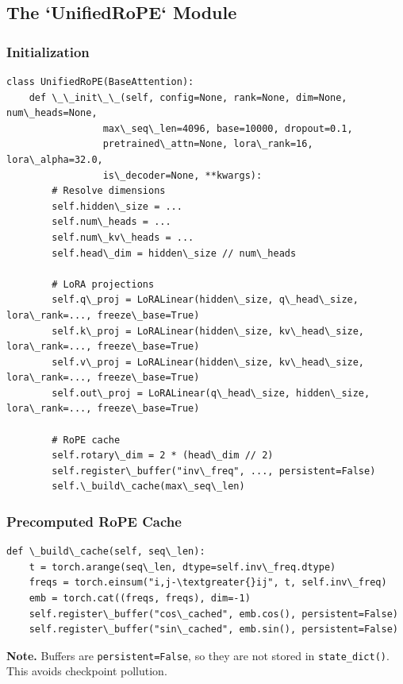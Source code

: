 \subsection{The `UnifiedRoPE` Module}

\subsubsection{Initialization}

\begin{lstlisting}
class UnifiedRoPE(BaseAttention):
    def \_\_init\_\_(self, config=None, rank=None, dim=None, num\_heads=None,
                 max\_seq\_len=4096, base=10000, dropout=0.1,
                 pretrained\_attn=None, lora\_rank=16, lora\_alpha=32.0,
                 is\_decoder=None, **kwargs):
        # Resolve dimensions
        self.hidden\_size = ...
        self.num\_heads = ...
        self.num\_kv\_heads = ...
        self.head\_dim = hidden\_size // num\_heads
        
        # LoRA projections
        self.q\_proj = LoRALinear(hidden\_size, q\_head\_size, lora\_rank=..., freeze\_base=True)
        self.k\_proj = LoRALinear(hidden\_size, kv\_head\_size, lora\_rank=..., freeze\_base=True)
        self.v\_proj = LoRALinear(hidden\_size, kv\_head\_size, lora\_rank=..., freeze\_base=True)
        self.out\_proj = LoRALinear(q\_head\_size, hidden\_size, lora\_rank=..., freeze\_base=True)
        
        # RoPE cache
        self.rotary\_dim = 2 * (head\_dim // 2)
        self.register\_buffer("inv\_freq", ..., persistent=False)
        self.\_build\_cache(max\_seq\_len)
\end{lstlisting}

\subsubsection{Precomputed RoPE Cache}

\begin{lstlisting}
def \_build\_cache(self, seq\_len):
    t = torch.arange(seq\_len, dtype=self.inv\_freq.dtype)
    freqs = torch.einsum("i,j-\textgreater{}ij", t, self.inv\_freq)
    emb = torch.cat((freqs, freqs), dim=-1)
    self.register\_buffer("cos\_cached", emb.cos(), persistent=False)
    self.register\_buffer("sin\_cached", emb.sin(), persistent=False)
\end{lstlisting}

\textbf{Note.} Buffers are \texttt{persistent=False}, so they are not stored in 
\texttt{state\_dict()}. This avoids checkpoint pollution.

